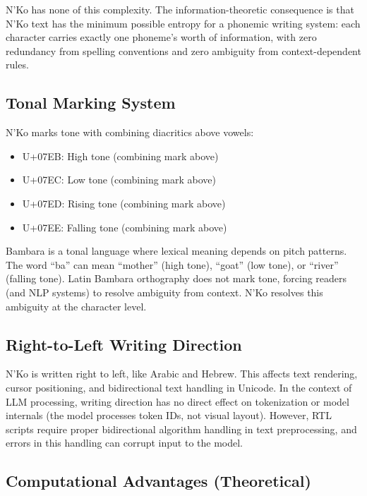 \documentclass[11pt]{article}
\begin{document}
N'Ko has none of this complexity.
The information-theoretic consequence is that N'Ko text has the minimum possible entropy for a phonemic writing system: each character carries exactly one phoneme's worth of information, with zero redundancy from spelling conventions and zero ambiguity from context-dependent rules.

\subsection{Tonal Marking System}

N'Ko marks tone with combining diacritics above vowels:
\begin{itemize}
\item U+07EB: High tone (combining mark above)
\item U+07EC: Low tone (combining mark above)
\item U+07ED: Rising tone (combining mark above)
\item U+07EE: Falling tone (combining mark above)
\end{itemize}

Bambara is a tonal language where lexical meaning depends on pitch patterns.
The word ``ba'' can mean ``mother'' (high tone), ``goat'' (low tone), or ``river'' (falling tone).
Latin Bambara orthography does not mark tone, forcing readers (and NLP systems) to resolve ambiguity from context.
N'Ko resolves this ambiguity at the character level.

\subsection{Right-to-Left Writing Direction}

N'Ko is written right to left, like Arabic and Hebrew.
This affects text rendering, cursor positioning, and bidirectional text handling in Unicode.
In the context of LLM processing, writing direction has no direct effect on tokenization or model internals (the model processes token IDs, not visual layout).
However, RTL scripts require proper bidirectional algorithm handling in text preprocessing, and errors in this handling can corrupt input to the model.

\subsection{Computational Advantages (Theoretical)}
\end{document}
